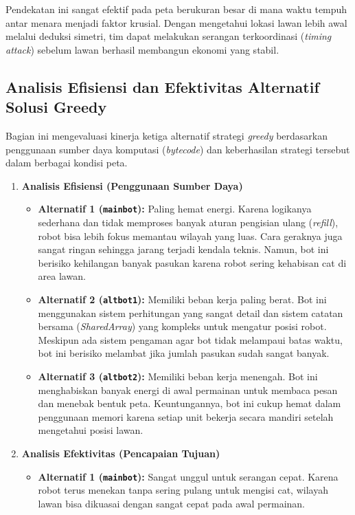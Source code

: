 Pendekatan ini sangat efektif pada peta berukuran besar di mana waktu tempuh antar menara menjadi faktor krusial. Dengan mengetahui lokasi lawan lebih awal melalui deduksi simetri, tim dapat melakukan serangan terkoordinasi (\textit{timing attack}) sebelum lawan berhasil membangun ekonomi yang stabil.

\subsection{Analisis Efisiensi dan Efektivitas Alternatif Solusi Greedy}

Bagian ini mengevaluasi kinerja ketiga alternatif strategi \textit{greedy} berdasarkan penggunaan sumber daya komputasi (\textit{bytecode}) dan keberhasilan strategi tersebut dalam berbagai kondisi peta.

\begin{enumerate}
    \item \textbf{Analisis Efisiensi (Penggunaan Sumber Daya)}
    \begin{itemize}
        \item \textbf{Alternatif 1 (\texttt{mainbot}):} Paling hemat energi. Karena logikanya sederhana dan tidak memproses banyak aturan pengisian ulang (\textit{refill}), robot bisa lebih fokus memantau wilayah yang luas. Cara geraknya juga sangat ringan sehingga jarang terjadi kendala teknis. Namun, bot ini berisiko kehilangan banyak pasukan karena robot sering kehabisan cat di area lawan.
        
        \item \textbf{Alternatif 2 (\texttt{altbot1}):} Memiliki beban kerja paling berat. Bot ini menggunakan sistem perhitungan yang sangat detail dan sistem catatan bersama (\textit{SharedArray}) yang kompleks untuk mengatur posisi robot. Meskipun ada sistem pengaman agar bot tidak melampaui batas waktu, bot ini berisiko melambat jika jumlah pasukan sudah sangat banyak.
        
        \item \textbf{Alternatif 3 (\texttt{altbot2}):} Memiliki beban kerja menengah. Bot ini menghabiskan banyak energi di awal permainan untuk membaca pesan dan menebak bentuk peta. Keuntungannya, bot ini cukup hemat dalam penggunaan memori karena setiap unit bekerja secara mandiri setelah mengetahui posisi lawan.
    \end{itemize}

    \item \textbf{Analisis Efektivitas (Pencapaian Tujuan)}
    \begin{itemize}
        \item \textbf{Alternatif 1 (\texttt{mainbot}):} Sangat unggul untuk serangan cepat. Karena robot terus menekan tanpa sering pulang untuk mengisi cat, wilayah lawan bisa dikuasai dengan sangat cepat pada awal permainan.
        

\end{itemize}
\end{enumerate}
